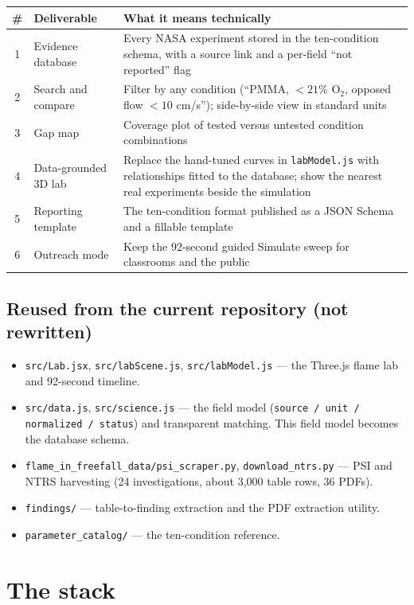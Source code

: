 \documentclass[11pt,a4paper]{article}
\newcommand{\Otwo}{\ensuremath{\mathrm{O_2}}}
\newcommand{\code}[1]{\texttt{#1}}
\begin{document}
\begin{tabularx}{\linewidth}{@{}c p{3.6cm} L@{}}
\toprule
\# & \textbf{Deliverable} & \textbf{What it means technically}\\
 & Evidence database & Every NASA experiment stored in the ten-condition schema, with a source link and a per-field ``not reported'' flag\\
2 & Search and compare & Filter by any condition (``PMMA, $<21\%$ \Otwo, opposed flow $<10$ cm/s''); side-by-side view in standard units\\
3 & Gap map & Coverage plot of tested versus untested condition combinations\\
4 & Data-grounded 3D lab & Replace the hand-tuned curves in \code{labModel.js} with relationships fitted to the database; show the nearest real experiments beside the simulation\\
5 & Reporting template & The ten-condition format published as a JSON Schema and a fillable template\\
6 & Outreach mode & Keep the 92-second guided Simulate sweep for classrooms and the public\\
\bottomrule
\end{tabularx}

\subsection*{Reused from the current repository (not rewritten)}
\begin{itemize}
  \item \code{src/Lab.jsx}, \code{src/labScene.js}, \code{src/labModel.js} --- the Three.js flame lab and 92-second timeline.
  \item \code{src/data.js}, \code{src/science.js} --- the field model (\code{source / unit / normalized / status}) and transparent matching. This field model becomes the database schema.
  \item \code{flame\_in\_freefall\_data/psi\_scraper.py}, \code{download\_ntrs.py} --- PSI and NTRS harvesting (24 investigations, about 3{,}000 table rows, 36 PDFs).
  \item \code{findings/} --- table-to-finding extraction and the PDF extraction utility.
  \item \code{parameter\_catalog/} --- the ten-condition reference.
\end{itemize}

\section{The stack}
\end{document}

